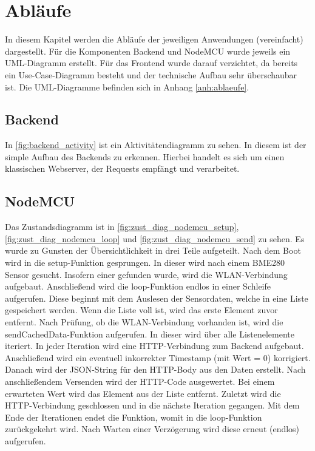 

\section{Abläufe}\label{Ablaeufe}
In diesem Kapitel werden die Abläufe der jeweiligen Anwendungen (vereinfacht) dargestellt. Für die Komponenten
Backend und NodeMCU wurde jeweils ein UML-Diagramm erstellt. Für das Frontend wurde darauf verzichtet, da bereits
ein Use-Case-Diagramm besteht und der technische Aufbau sehr überschaubar ist. Die UML-Diagramme befinden sich in Anhang
\ref{anh:ablaeufe}.

\subsection{Backend}
In \autoref{fig:backend_activity} ist ein Aktivitätendiagramm zu sehen. In diesem ist der simple Aufbau des Backends
zu erkennen. Hierbei handelt es sich um einen klassischen Webserver, der Requests empfängt und verarbeitet.

\subsection{NodeMCU}
Das Zustandsdiagramm ist in \autoref{fig:zust_diag_nodemcu_setup}, \autoref{fig:zust_diag_nodemcu_loop} und
\autoref{fig:zust_diag_nodemcu_send} zu sehen. Es wurde zu Gunsten der Übersichtlichkeit in drei Teile aufgeteilt.
Nach dem Boot wird in die setup-Funktion gesprungen.
In dieser wird nach einem BME280 Sensor gesucht.
Insofern einer gefunden wurde, wird die WLAN-Verbindung aufgebaut.
Anschließend wird die loop-Funktion endlos in einer Schleife aufgerufen.
Diese beginnt mit dem Auslesen der Sensordaten, welche in eine Liste gespeichert werden.
Wenn die Liste voll ist, wird das erste Element zuvor entfernt.
Nach Prüfung, ob die WLAN-Verbindung vorhanden ist, wird die sendCachedData-Funktion aufgerufen.
In dieser wird über alle Listenelemente iteriert.
In jeder Iteration wird eine HTTP-Verbindung zum Backend aufgebaut.
Anschließend wird ein eventuell inkorrekter Timestamp (mit Wert = 0) korrigiert.
Danach wird der JSON-String für den HTTP-Body aus den Daten erstellt.
Nach anschließendem Versenden wird der HTTP-Code ausgewertet.
Bei einem erwarteten Wert wird das Element aus der Liste entfernt.
Zuletzt wird die HTTP-Verbindung geschlossen und in die nächste Iteration gegangen.
Mit dem Ende der Iterationen endet die Funktion, womit in die loop-Funktion zurückgekehrt wird.
Nach Warten einer Verzögerung wird diese erneut (endlos) aufgerufen.
